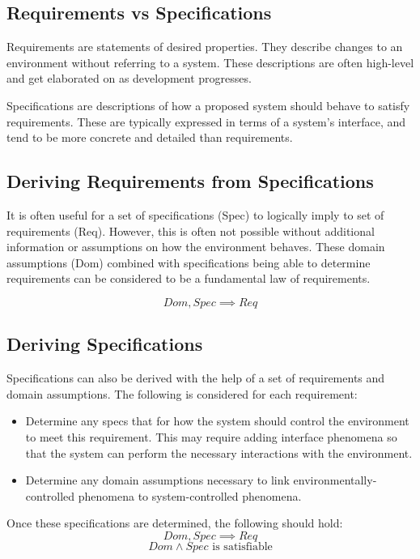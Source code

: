 \documentclass[12pt,titlepage]{article}
\begin{document}
    \subsection{Requirements vs Specifications}
      Requirements are statements of desired properties. They describe changes to an environment without referring to a system. These descriptions are often
      high-level and get elaborated on as development progresses.

      Specifications are descriptions of how a proposed system should behave to satisfy requirements. These are typically expressed in terms of a system's
      interface, and tend to be more concrete and detailed than requirements.

    \subsection{Deriving Requirements from Specifications}
      It is often useful for a set of specifications (Spec) to logically imply to set of requirements (Req). However, this is often not possible without additional
      information or assumptions on how the environment behaves. These domain assumptions (Dom) combined with specifications being able to determine requirements
      can be considered to be a fundamental law of requirements.

      $$ Dom, Spec \implies Req $$

    \subsection{Deriving Specifications}
      Specifications can also be derived with the help of a set of requirements and domain assumptions. The following is considered for each requirement:
      \begin{itemize}
        \item Determine any specs that for how the system should control the environment to meet this requirement. This may require adding interface phenomena
          so that the system can perform the necessary interactions with the environment.
        \item Determine any domain assumptions necessary to link environmentally-controlled phenomena to system-controlled phenomena.
      \end{itemize}

      Once these specifications are determined, the following should hold:
      $$ Dom, Spec \implies Req $$
      $$ Dom \land Spec \text{ is satisfiable}$$
\end{document}
